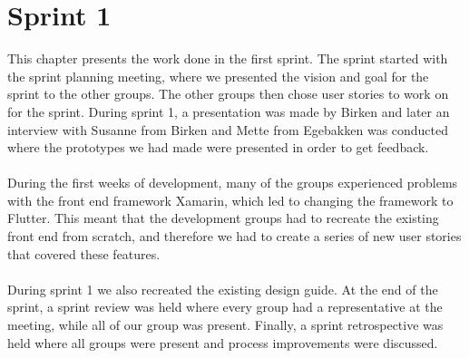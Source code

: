 \chapter{Sprint 1}
This chapter presents the work done in the first sprint.
The sprint started with the sprint planning meeting, where we presented the vision and goal for the sprint to the other groups.
The other groups then chose user stories to work on for the sprint.
During sprint 1, a presentation was made by Birken and later an interview with Susanne from Birken and Mette from Egebakken was conducted where the prototypes we had made were presented in order to get feedback.
\\\\
During the first weeks of development, many of the groups experienced problems with the front end framework Xamarin, which led to changing the framework to Flutter.
This meant that the development groups had to recreate the existing front end from scratch, and therefore we had to create a series of new user stories that covered these features.
\\\\
During sprint 1 we also recreated the existing design guide.
At the end of the sprint, a sprint review was held where every group had a representative at the meeting, while all of our group was present.
Finally, a sprint retrospective was held where all groups were present and process improvements were discussed.
